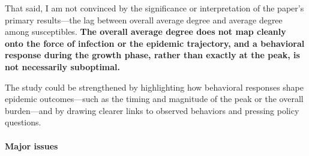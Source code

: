 \documentclass{article}
\newcommand{\red}[1]{{\textcolor{red}{#1}}}
\begin{document}
That said, I am not convinced by the significance or interpretation of the paper’s primary results—the lag between overall average degree and average degree among susceptibles. 
{\bf 
The overall average degree does not map cleanly onto the force of infection or the epidemic trajectory, and a behavioral response during the growth phase, rather than exactly at the peak, is not necessarily suboptimal.
}

The study could be strengthened by highlighting how behavioral responses shape epidemic outcomes—such as the timing and magnitude of the peak or the overall burden—and by drawing clearer links to observed behaviors and pressing policy questions.
    

\paragraph{Major issues}
\end{document}
